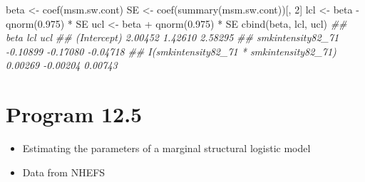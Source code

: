\documentclass[
  10pt,
  a4paper,
]{book}
\newenvironment{Shaded}{\begin{snugshade}}{\end{snugshade}}
\newcommand{\DecValTok}[1]{\textcolor[rgb]{0.68,0.00,0.00}{#1}}
\newcommand{\DocumentationTok}[1]{\textcolor[rgb]{0.37,0.37,0.37}{\textit{#1}}}
\newcommand{\FloatTok}[1]{\textcolor[rgb]{0.68,0.00,0.00}{#1}}
\newcommand{\FunctionTok}[1]{\textcolor[rgb]{0.28,0.35,0.67}{#1}}
\newcommand{\NormalTok}[1]{\textcolor[rgb]{0.00,0.46,0.62}{#1}}
\newcommand{\OtherTok}[1]{\textcolor[rgb]{0.00,0.46,0.62}{#1}}
\newcommand{\SpecialCharTok}[1]{\textcolor[rgb]{0.37,0.37,0.37}{#1}}
\providecommand{\tightlist}{%
  \setlength{\itemsep}{0pt}\setlength{\parskip}{0pt}}
\begin{document}
\begin{Shaded}
\begin{Highlighting}[]
\NormalTok{beta }\OtherTok{\textless{}{-}} \FunctionTok{coef}\NormalTok{(msm.sw.cont)}
\NormalTok{SE }\OtherTok{\textless{}{-}} \FunctionTok{coef}\NormalTok{(}\FunctionTok{summary}\NormalTok{(msm.sw.cont))[, }\DecValTok{2}\NormalTok{]}
\NormalTok{lcl }\OtherTok{\textless{}{-}}\NormalTok{ beta }\SpecialCharTok{{-}} \FunctionTok{qnorm}\NormalTok{(}\FloatTok{0.975}\NormalTok{) }\SpecialCharTok{*}\NormalTok{ SE}
\NormalTok{ucl }\OtherTok{\textless{}{-}}\NormalTok{ beta }\SpecialCharTok{+} \FunctionTok{qnorm}\NormalTok{(}\FloatTok{0.975}\NormalTok{) }\SpecialCharTok{*}\NormalTok{ SE}
\FunctionTok{cbind}\NormalTok{(beta, lcl, ucl)}
\DocumentationTok{\#\#                                              beta      lcl      ucl}
\DocumentationTok{\#\# (Intercept)                               2.00452  1.42610  2.58295}
\DocumentationTok{\#\# smkintensity82\_71                        {-}0.10899 {-}0.17080 {-}0.04718}
\DocumentationTok{\#\# I(smkintensity82\_71 * smkintensity82\_71)  0.00269 {-}0.00204  0.00743}
\end{Highlighting}
\end{Shaded}

\hypertarget{program-12.5}{%
\section{Program 12.5}\label{program-12.5}}

\begin{itemize}
\tightlist
\item
  Estimating the parameters of a marginal structural logistic model
\item
  Data from NHEFS
\end{itemize}
\end{document}
